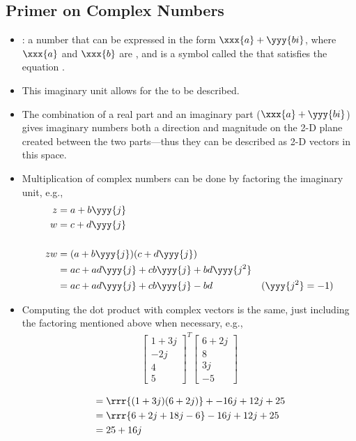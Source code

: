 \begin{itemize}
  \subsection{Primer on Complex Numbers}\label{Primer on Complex Numbers}
  \begin{itemize}
    \item {}: a number that can be expressed in the form \(\xxx{a} + \yyy{bi}\), where \(\xxx{a}\) and \(\xxx{b}\) are , and  is a symbol called the  that satisfies the equation .
    \item This imaginary unit allows for the  to be described. 
    \item The combination of a real part and an imaginary part (\(\xxx{a} + \yyy{bi}\)) gives imaginary numbers both a direction and magnitude on the 2-D plane created between the two parts---thus they can be described as 2-D vectors in this space.
    \item Multiplication of complex numbers can be done by factoring the imaginary unit, e.g.,
    \begin{align*}
      z &= a + b\yyy{j}  \\
      w &= c + d\yyy{j}  \\
      \\
      zw &= (a+b\yyy{j})(c+d\yyy{j}) &  \\
      &= ac + ad\yyy{j} + cb\yyy{j} + bd\yyy{j^2} \\
      &= ac + ad\yyy{j} + cb\yyy{j} - bd & (\yyy{j^2} = -1)
    \end{align*}
    \item Computing the dot product with complex vectors is the same, just including the factoring mentioned above when necessary, e.g.,
    \begin{align*}
      \begin{bmatrix}
      1+3j \\
      -2j \\
      4 \\
      5 
      \end{bmatrix}^T
      \begin{bmatrix}
      6+2j \\
      8 \\
      3j \\
      -5 
      \end{bmatrix}\\
    \end{align*}
    \vspace{-45pt}
    \begin{align*}
      &= \rrr{(1+3j)(6+2j)} + -16j + 12j + 25  \\
      &= \rrr{6 + 2j + 18j - 6} - 16j + 12j + 25 \\
      &= 25 + 16j
    \end{align*}
  \end{itemize}
  

\end{itemize}

